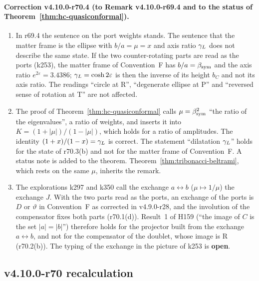 \paragraph{Correction v4.10.0-r70.4 (to Remark v4.10.0-r69.4 and to the status of Theorem~\ref{thm:hc-quasiconformal}).}
\begin{enumerate}[leftmargin=2em]
\item[(a)] In r69.4 the sentence on the port weights stands.  The sentence that the matter frame is the ellipse with \(b/a=\mu=x\) and axis
ratio \(\gamma_L\) does not describe the same state.  If the two counter-rotating parts are read as the ports (k253), the matter frame of
Convention~F has \(b/a=\beta_{\mathrm{sym}}\) and the axis ratio \(e^{2\varepsilon}=3.4386\); \(\gamma_L=\cosh2\varepsilon\) is then the inverse of its height
\(b_C\) and not its axis ratio.  The readings ``circle at R'', ``degenerate ellipse at P'' and ``reversed sense of rotation at T'' are not
affected.
\item[(b)] The proof of Theorem~\ref{thm:hc-quasiconformal} calls \(\mu=\beta_{\mathrm{sym}}^2\) ``the ratio of the eigenvalues'', a ratio of weights, and
inserts it into \(K=(1+|\mu|)/(1-|\mu|)\), which holds for a ratio of amplitudes.  The identity \((1+x)/(1-x)=\gamma_L\) is correct.  The statement
``dilatation \(\gamma_L\)'' holds for the state of r70.3(b) and not for the matter frame of Convention~F.  A status note is added to the theorem.
Theorem~\ref{thm:tribonacci-beltrami}, which rests on the same \(\mu\), inherits the remark.
\item[(c)] The explorations k297 and k350 call the exchange \(a\leftrightarrow b\) (\(\mu\mapsto1/\mu\)) the exchange \(J\).  With the two parts
read as the ports, an exchange of the ports is \(D\) or \(\vartheta\) in Convention~F as corrected in v4.9.0-r28, and the involution of the
compensator fixes both parts (r70.1(d)).  Result~1 of H159 (``the image of \(C\) is the set \(|a|=|b|\)'') therefore holds for the projector
built from the exchange \(a\leftrightarrow b\), and not for the compensator of the doublet, whose image is R (r70.2(b)).  The typing of the
exchange in the picture of k253 is \textbf{open}.
\end{enumerate}

\subsection*{v4.10.0-r70 recalculation}
\label{subsec:v4100-r70-recalculation}

